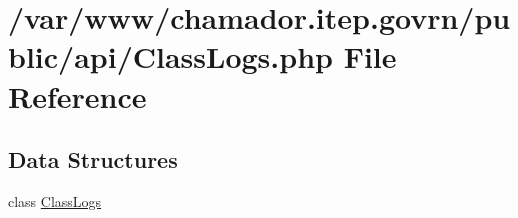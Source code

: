 \hypertarget{_class_logs_8php}{}\section{/var/www/chamador.itep.\+govrn/public/api/\+Class\+Logs.php File Reference}
\label{_class_logs_8php}
\subsection*{Data Structures}
\begin{DoxyCompactItemize}
\item 
class \hyperlink{class_class_logs}{Class\+Logs}
\end{DoxyCompactItemize}
